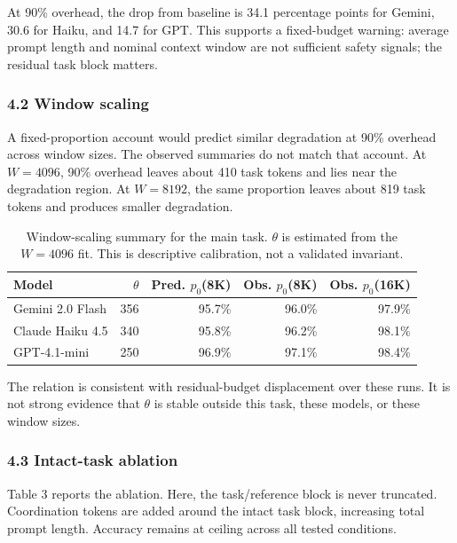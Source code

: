 \documentclass[
  runningheads]{llncs}
\begin{document}
At 90\% overhead, the drop from baseline is 34.1 percentage points for
Gemini, 30.6 for Haiku, and 14.7 for GPT. This supports a fixed-budget
warning: average prompt length and nominal context window are not
sufficient safety signals; the residual task block matters.

\subsubsection{4.2 Window scaling}\label{window-scaling}

A fixed-proportion account would predict similar degradation at 90\%
overhead across window sizes. The observed summaries do not match that
account. At \(W=4096\), 90\% overhead leaves about 410 task tokens and
lies near the degradation region. At \(W=8192\), the same proportion
leaves about 819 task tokens and produces smaller degradation.

\begin{table}[t]
\centering
\small
\caption{Window-scaling summary for the main task. $\theta$ is estimated from the $W=4096$ fit. This is descriptive calibration, not a validated invariant.}
\begin{tabular}{lrrrr}
\toprule
Model & $\theta$ & Pred. $p_0$(8K) & Obs. $p_0$(8K) & Obs. $p_0$(16K) \\
\midrule
Gemini 2.0 Flash & 356 & 95.7\% & 96.0\% & 97.9\% \\
Claude Haiku 4.5 & 340 & 95.8\% & 96.2\% & 98.1\% \\
GPT-4.1-mini & 250 & 96.9\% & 97.1\% & 98.4\% \\
\bottomrule
\end{tabular}
\end{table}

The relation is consistent with residual-budget displacement over these
runs. It is not strong evidence that \(\theta\) is stable outside this
task, these models, or these window sizes.

\subsubsection{4.3 Intact-task ablation}\label{intact-task-ablation-1}

Table 3 reports the ablation. Here, the task/reference block is never
truncated. Coordination tokens are added around the intact task block,
increasing total prompt length. Accuracy remains at ceiling across all
tested conditions.
\end{document}
